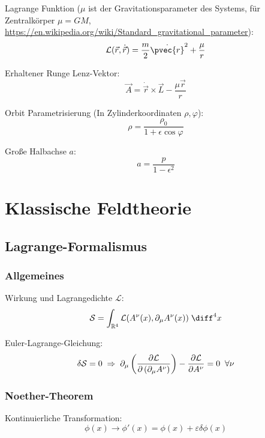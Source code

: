 \documentclass[11pt]{article}
\numberwithin{equation}{section}
\begin{document}
        Lagrange Funktion ($\mu$ ist der Gravitationsparameter des Systems, für Zentralkörper $\mu=GM$, \url{https://en.wikipedia.org/wiki/Standard_gravitational_parameter}):
        \begin{equation}
          \mathcal{L}(\vec{r},\dot{\vec{r}}) = \frac{m}{2} \dot{\pvec{r}}^2 + \frac{\mu}{r}
        \end{equation}

        Erhaltener Runge Lenz-Vektor:
        \begin{equation}
          \vec{A} = \dot{\vec{r}}\times\vec{L} - \frac{\mu \vec{r}}{r}
        \end{equation}

        Orbit Parametrisierung (In Zylinderkoordinaten $\rho, \varphi$):
        \begin{equation}
          \rho = \frac{\rho_0}{1+\epsilon \cos\varphi}
        \end{equation}

        Große Halbachse $a$:
        \begin{equation}
          a = \frac{p}{1-\epsilon^2}
        \end{equation}

  \newpage
	\section{Klassische Feldtheorie}
    \subsection{Lagrange-Formalismus}
      \subsubsection{Allgemeines}

      Wirkung und Lagrangedichte $\mathcal{L}$:
      \begin{equation}
        \mathcal{S} = \int_{\mathbb{R}^4} \mathcal{L}(A^\nu(x),\partial_\mu A^\nu(x)) \;\diff^4 x
      \end{equation}

      Euler-Lagrange-Gleichung:
      \begin{equation}
        \delta\mathcal{S} = 0
        \;\Rightarrow\; \partial_\mu \left(\frac{\partial \mathcal{L}}{\partial \left(\partial_\mu A^\nu\right)}\right) - \frac{\partial \mathcal{L}}{\partial A^\nu} = 0 \;\;\forall \nu
      \end{equation}

      \subsubsection{Noether-Theorem}
      Kontinuierliche Transformation:
      \begin{equation}
        \phi(x)\rightarrow\phi'(x) = \phi(x) + \varepsilon \delta \phi(x)
      \end{equation}
\end{document}
